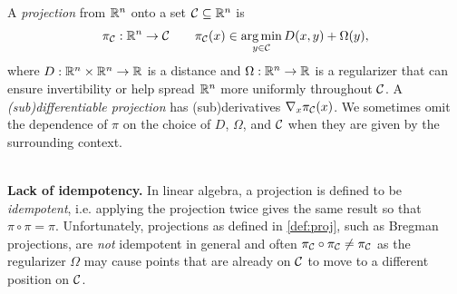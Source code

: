 \documentclass[twoside,11pt]{article}
\newcommand{\ie}{i.e.\xspace}
\begin{document}
\noindent
\begin{minipage}{0.65\textwidth}
\begin{definition}
  A \emph{projection} from $\mathbb{R}^n$ onto a set ${\mathcal{C}}\subseteq \mathbb{R}^n$ is
  \begin{equation}
    \pi_{\mathcal{C}}: \mathbb{R}^n\rightarrow {\mathcal{C}} \qquad \pi_{\mathcal{C}}(x) \in \operatorname*{arg\,min}_{y\in{\mathcal{C}}} D(x, y) + \Omega(y),
    \label{eq:proj}
  \end{equation}
  where $D: \mathbb{R}^n\times\mathbb{R}^n\rightarrow \mathbb{R}$ is a distance and $\Omega:\mathbb{R}^n\rightarrow \mathbb{R}$ is
  a regularizer that can ensure invertibility or help spread $\mathbb{R}^n$ more uniformly throughout ${\mathcal{C}}$.
  A \emph{(sub)differentiable projection} has (sub)derivatives $\nabla_x \pi_{\mathcal{C}}(x)$.
  We sometimes omit the dependence of $\pi$ on the choice of $D$, $\Omega$, and ${\mathcal{C}}$
  when they are given by the surrounding context.
  \label{def:proj}
\end{definition}
\end{minipage}
\begin{minipage}{0.35\textwidth}
  \hspace{8mm}
\end{minipage} \\

\textbf{Lack of idempotency.} In linear algebra, a projection is defined to
be \emph{idempotent}, \ie applying the projection twice gives the same result
so that $\pi\circ \pi=\pi$.
Unfortunately, projections as defined in \cref{def:proj},
such as Bregman projections, are \emph{not} idempotent in general
and often $\pi_{\mathcal{C}}\circ \pi_{\mathcal{C}}\neq \pi_{\mathcal{C}}$
as the regularizer $\Omega$ may cause points that are already on ${\mathcal{C}}$
to move to a different position on ${\mathcal{C}}$.
\end{document}
